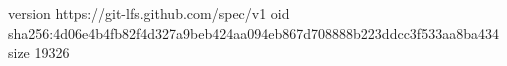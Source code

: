 version https://git-lfs.github.com/spec/v1
oid sha256:4d06e4b4fb82f4d327a9beb424aa094eb867d708888b223ddcc3f533aa8ba434
size 19326
